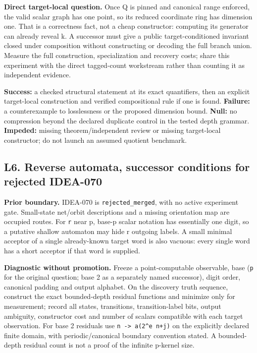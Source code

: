 \documentclass[
  10pt,
]{article}
\begin{document}
\textbf{Direct target-local question.} Once Q is pinned and canonical
range enforced, the valid scalar graph has one point, so its reduced
coordinate ring has dimension one. That is a correctness fact, not a
cheap constructor: computing its generator can already reveal k. A
successor must give a public target-conditioned invariant closed under
composition without constructing or decoding the full branch union.
Measure the full construction, specialization and recovery costs; share
this experiment with the direct tagged-count workstream rather than
counting it as independent evidence.

\textbf{Success:} a checked structural statement at its exact
quantifiers, then an explicit target-local construction and verified
compositional rule if one is found. \textbf{Failure:} a counterexample
to losslessness or the proposed dimension bound. \textbf{Null:} no
compression beyond the declared duplicate control in the tested depth
grammar. \textbf{Impeded:} missing theorem/independent review or missing
target-local constructor; do not launch an assumed quotient benchmark.

\subsection{L6. Reverse automata, successor conditions for rejected
IDEA-070}\label{l6.-reverse-automata-successor-conditions-for-rejected-idea-070}

\textbf{Prior boundary.} IDEA-070 is \texttt{rejected\_merged}, with no
active experiment gate. Small-state net/orbit descriptions and a missing
orientation map are occupied routes. For \texttt{r} near p, base-p
scalar notation has essentially one digit, so a putative shallow
automaton may hide r outgoing labels. A small minimal acceptor of a
single already-known target word is also vacuous: every single word has
a short acceptor if that word is supplied.

\textbf{Diagnostic without promotion.} Freeze a point-computable
observable, base (\texttt{p} for the original question; base 2 as a
separately named successor), digit order, canonical padding and output
alphabet. On the discovery truth sequence, construct the exact
bounded-depth residual functions and minimize only for measurement;
record all states, transitions, transition-label bits, output ambiguity,
constructor cost and number of scalars compatible with each target
observation. For base 2 residuals use
\texttt{n\ -\textgreater{}\ a(2\^{}e\ n+j)} on the explicitly declared
finite domain, with periodic/canonical boundary convention stated. A
bounded-depth residual count is not a proof of the infinite p-kernel
size.
\end{document}
